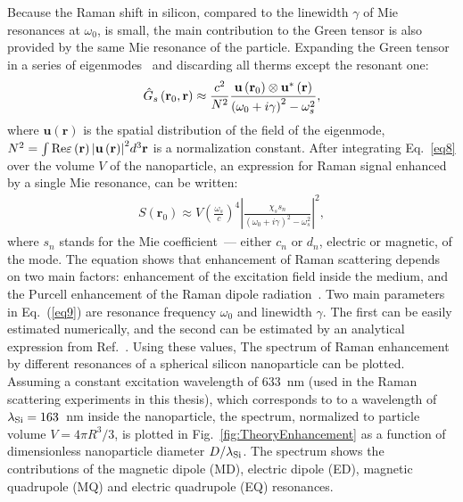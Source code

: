         Because the Raman shift in silicon, compared to the linewidth $\gamma$ of Mie resonances at $\omega_0$, is small, the main contribution
        to the Green tensor is also provided by the same Mie resonance of the particle. Expanding the Green tensor in a series of
        eigenmodes~\cite{ishimaru1991electromagnetic} and discarding all therms except the resonant one:
        \begin{align}
            {\hat G_s}\left( {{{\bf{r}}_0},{\bf{r}}} \right) \approx \frac{{{c^2}}}{{{N^2}}}\frac{{{\bf{u}}\left( {{{\bf{r}}_0}} \right) \otimes
            {\bf{u}}^*\left( {\bf{r}} \right)}}{{{{\left( {{\omega _0} + i\gamma } \right)}^2} - \omega _s^2}},
            \label{eq8}
        \end{align}
        where ${{\mathbf{u}}\left( {{\mathbf r}} \right)}$ is the spatial distribution of the field of the eigenmode,
        ${N^2} = {\int {{\mathop{\rm Re}\nolimits} \varepsilon \left( {\bf{r}} \right)\left| {{\bf{u}}\left( {\bf{r}} \right)} \right|} ^2}{d^3}{\bf{r}}$
        is a normalization constant. After integrating Eq.~\ref{eq8} over the volume $V$ of the nanoparticle,
        an expression for Raman signal enhanced by a single Mie resonance, can be written:
        \begin{align}
            S\left( {{{\mathbf{r}}_0}} \right) \approx V{\left( {\frac{{{\omega _s}}}{c}} \right)^4}{\left| {\frac{{{\chi_s s_n}}}{{{{\left( {{\omega
            _0} + i\gamma } \right)}^2} - \omega _s^2}}} \right|^2},
            \label{eq9}
        \end{align}
        where $s_n$ stands for the Mie coefficient~--- either $c_n$ or $d_n$, electric or magnetic, of the mode. The equation
        shows that enhancement of Raman scattering depends on two main factors: enhancement of the excitation field
        inside the medium, and the Purcell enhancement of the Raman dipole radiation~\cite{checoury2010deterministic}.
        Two main parameters in Eq.~(\ref{eq9}) are resonance frequency $\omega_0$ and linewidth $\gamma$. The first can be
        easily estimated numerically, and the second can be estimated by an analytical expression from Ref.~\cite{lai1991effect}.
        Using these values, The spectrum of Raman enhancement by different resonances of a spherical silicon nanoparticle can be plotted.
        Assuming a constant excitation wavelength of 633~nm (used in the Raman scattering experiments in this thesis), which corresponds to
        to a wavelength of $\lambda_{\rm Si}=163$~nm inside the nanoparticle, the spectrum, normalized to particle volume $V=4\pi R^3/3$, is
        plotted in Fig.~\ref{fig:TheoryEnhancement} as a  function of dimensionless nanoparticle diameter $D/\lambda_{\rm Si}$. The spectrum
        shows the contributions of the magnetic dipole (MD), electric dipole (ED), magnetic quadrupole (MQ) and electric quadrupole (EQ) resonances.

